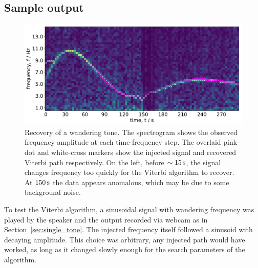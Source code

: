 \documentclass[paper-main.tex]{subfiles}
\begin{document}
\subsection{Sample output}
\label{sec:wanderingResults}

\begin{figure}
	\includegraphics[width=\textwidth]{figures/expt_overlay_2_viterbi_test_webcam.pdf}
	\caption{\label{fig:viterbi_overlay}
Recovery of a wandering tone. 
The spectrogram shows the observed frequency amplitude at each time-frequency step. 
The overlaid pink-dot and white-cross markers show the injected signal and recovered Viterbi path respectively. 
On the left, before $\sim 15\,{\rm s}$, the signal changes frequency too quickly for the Viterbi algorithm to recover. 
At $150\,{\rm s}$ the data appears anomalous, which may be due to some background noise. }
\end{figure}
 
To test the Viterbi algorithm, a sinusoidal signal with wandering frequency was played by the speaker and the output recorded via webcam as in Section~\ref{sec:single_tone}. The injected frequency itself followed a sinusoid with decaying amplitude. This choice was arbitrary, any injected path would have worked, as long as it changed slowly enough for the search parameters of the algorithm.
\end{document}
